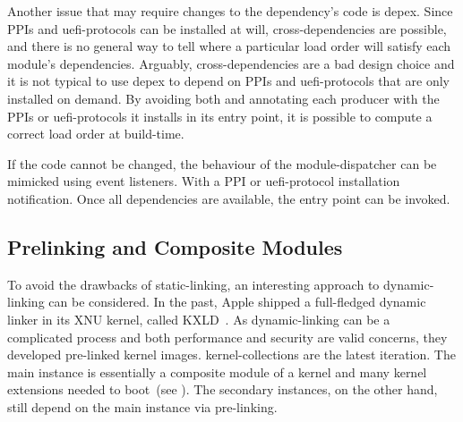 Another issue that may require changes to the dependency's code is \gls{depex}. Since \glspl{PPI} and \glspl{uefi-protocol} can be installed at will, cross-dependencies are possible, and there is no general way to tell where a particular load order will satisfy each module's dependencies. Arguably, cross-dependencies are a bad design choice and it is not typical to use \gls{depex} to depend on \glspl{PPI} and \glspl{uefi-protocol} that are only installed on demand. By avoiding both and annotating each producer with the \glspl{PPI} or \glspl{uefi-protocol} it installs in its entry point, it is possible to compute a correct load order at build-time.

If the code cannot be changed, the behaviour of the \gls{module-dispatcher} can be mimicked using event listeners. With a \gls{PPI} or \gls{uefi-protocol}  installation notification. Once all dependencies are available, the entry point can be invoked.

\subsection{Prelinking and Composite Modules}
\label{sec:compmod}

To avoid the drawbacks of \gls{static-linking}, an interesting approach to \gls{dynamic-linking} can be considered. In the past, Apple shipped a full-fledged dynamic linker in its XNU kernel, called KXLD~\cite{xnu}. As \gls{dynamic-linking} can be a complicated process and both performance and security are valid concerns, they developed pre-linked kernel \glspl{image}. \Glspl{kernel-collection} are the latest iteration. The main instance is essentially a composite module of a kernel and many kernel extensions needed to boot~(see ). The secondary instances, on the other hand, still depend on the main instance via pre-linking.

